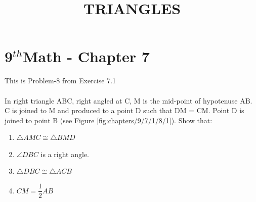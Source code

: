 \documentclass[10pt]{article}
\begin{document}
\begin{center}
\title{\textbf{TRIANGLES}}
\date{\vspace{-5ex}}
\maketitle
\end{center}
\section*{9$^{th}$Math - Chapter 7}
This is Problem-8 from Exercise 7.1\\\\
In right triangle ABC, right angled at C, M is the mid-point of hypotenuse AB. C is joined to M and produced to a point D such that DM = CM. Point D is joined to point B (see Figure \ref{fig:chapters/9/7/1/8/1}). Show that:
\begin{enumerate}
\item $\triangle AMC \cong \triangle BMD$
\item $\angle DBC$ is a right angle.
\item $\triangle DBC \cong \triangle ACB$
\item $CM = \dfrac{1}{2}AB$
\end{enumerate}
\end{document}

